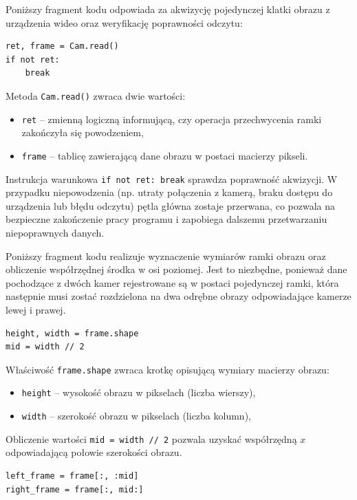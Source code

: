 \documentclass[magisterska]{pracadypl}
\begin{document}
Poniższy fragment kodu odpowiada za akwizycję pojedynczej klatki obrazu z urządzenia 
wideo oraz weryfikację poprawności odczytu:  

\begin{lstlisting}[style=mypython]
ret, frame = Cam.read()
if not ret:
    break
\end{lstlisting}

Metoda \texttt{Cam.read()} zwraca dwie wartości:  
\begin{itemize}
    \item \texttt{ret} – zmienną logiczną informującą, czy operacja przechwycenia ramki zakończyła się powodzeniem,  
    \item \texttt{frame} – tablicę zawierającą dane obrazu w postaci macierzy pikseli.  
\end{itemize}

Instrukcja warunkowa \texttt{if not ret: break} sprawdza poprawność akwizycji. 
W przypadku niepowodzenia (np. utraty połączenia z kamerą, braku dostępu do urządzenia 
lub błędu odczytu) pętla główna zostaje przerwana, co pozwala na bezpieczne zakończenie 
pracy programu i zapobiega dalszemu przetwarzaniu niepoprawnych danych.  
  
Poniższy fragment kodu realizuje wyznaczenie wymiarów ramki obrazu oraz obliczenie współrzędnej środka w osi poziomej. Jest to niezbędne, ponieważ dane pochodzące z dwóch kamer rejestrowane są w postaci pojedynczej ramki, która następnie musi zostać rozdzielona na dwa odrębne obrazy odpowiadające kamerze lewej i prawej.

\begin{lstlisting}[style=mypython]
height, width = frame.shape
mid = width // 2
\end{lstlisting}

Właściwość \texttt{frame.shape} zwraca krotkę opisującą wymiary macierzy obrazu:  
\begin{itemize}
    \item \texttt{height} – wysokość obrazu w pikselach (liczba wierszy),  
    \item \texttt{width} – szerokość obrazu w pikselach (liczba kolumn),  
\end{itemize}

Obliczenie wartości \texttt{mid = width // 2} pozwala uzyskać współrzędną $x$ odpowiadającą połowie szerokości obrazu.

\begin{lstlisting}[style=mypython]
left_frame = frame[:, :mid]
right_frame = frame[:, mid:]
\end{lstlisting}
\end{document}
